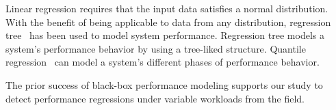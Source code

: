 Linear regression requires that the input data satisfies a normal distribution. With the benefit of being applicable to data from any distribution, regression tree~\citep{DBLP:conf/wosp/XiongPZG13} has been used to model system performance. Regression tree models a system's performance behavior by using a tree-liked structure. Quantile regression~\citep{DBLP:conf/asplos/OliveiraFDHS13} can model a system's different phases of performance behavior.




The prior success of black-box performance modeling supports our study to detect performance regressions under variable workloads from the field.